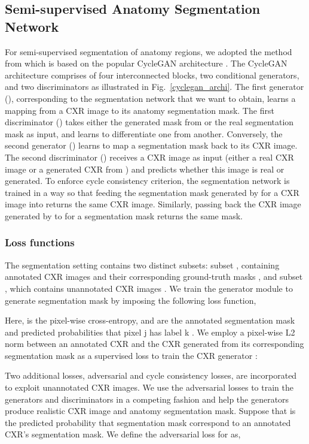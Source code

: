 \documentclass[journal]{IEEEtran}
\begin{document}
\subsection{Semi-supervised Anatomy Segmentation Network}
For semi-supervised segmentation of anatomy regions, we adopted the method from \cite{Mondal2019RevisitingCF} which is based on the popular CycleGAN architecture \cite{cyclegan}. The CycleGAN architecture comprises of four interconnected blocks, two conditional generators, and two discriminators as illustrated in Fig.~\ref{cyclegan_archi}. The first generator (), corresponding to the segmentation network that we want to obtain, learns a mapping from a CXR image to its anatomy segmentation mask. The first discriminator () takes either the generated mask from  or the real segmentation mask as input, and learns to differentiate one from another. Conversely, the second generator () learns to map a segmentation mask back to its CXR image. The second discriminator () receives a CXR image as input (either a real CXR image or a generated CXR from ) and predicts whether this image is real or generated. To enforce cycle consistency criterion, the segmentation network is trained in a way so that feeding the segmentation mask generated by  for a CXR image into  returns the same CXR image. Similarly, passing back the CXR image generated by  to  for a segmentation mask returns the same mask.

\subsubsection{\textbf{Loss functions}}
The segmentation setting contains two distinct subsets: subset , containing annotated CXR images  and their corresponding ground-truth masks , and subset , which contains unannotated CXR images . We train the generator module  to generate segmentation mask by imposing the following loss function,

Here,  is the pixel-wise cross-entropy,  and  are the annotated segmentation mask and predicted probabilities that pixel j  has label k . We employ a pixel-wise L2 norm between an annotated CXR and the CXR generated from its corresponding segmentation mask as a supervised loss to train the CXR generator :

Two additional losses, adversarial and cycle consistency losses, are incorporated to exploit unannotated CXR images. We use the adversarial losses to train the generators and discriminators in a competing fashion and help the generators produce realistic CXR image and anatomy segmentation mask. Suppose that  is the predicted probability that segmentation mask  correspond to an annotated CXR's segmentation mask. We define the adversarial loss for  as,
\end{document}
